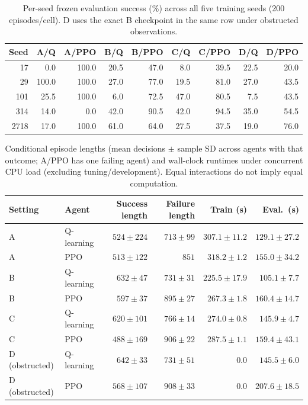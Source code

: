 \begin{table}[H]
\centering\small
\begin{tabular}{@{}rrrrrrrrr@{}}
\toprule
Seed & A/Q & A/PPO & B/Q & B/PPO & C/Q & C/PPO & D/Q & D/PPO \\
\midrule
17   &   0.0 & 100.0 & 20.5 & 47.0 &  8.0 & 39.5 & 22.5 & 20.0 \\
29   & 100.0 & 100.0 & 27.0 & 77.0 & 19.5 & 81.0 & 27.0 & 43.5 \\
101  &  25.5 & 100.0 &  6.0 & 72.5 & 47.0 & 80.5 &  7.5 & 43.5 \\
314  &  14.0 &   0.0 & 42.0 & 90.5 & 42.0 & 94.5 & 35.0 & 54.5 \\
2718 &  17.0 & 100.0 & 61.0 & 64.0 & 27.5 & 37.5 & 19.0 & 76.0 \\
\bottomrule
\end{tabular}
\caption{Per-seed frozen evaluation success (\%) across all five training seeds (200 episodes/cell). D uses the exact B checkpoint in the same row under obstructed observations.}
\label{tab:seeds}
\end{table}

\begin{table}[H]
\centering\small\setlength{\tabcolsep}{4pt}
\begin{tabular}{@{}llrrrr@{}}
\toprule
Setting & Agent & Success length & Failure length & Train (s) & Eval.\ (s) \\
\midrule
A & Q-learning & $524 \pm 224$ & $713 \pm 99$ & $307.1 \pm 11.2$ & $129.1 \pm 27.2$ \\
A & PPO & $513 \pm 122$ & $851$ & $318.2 \pm 1.2$ & $155.0 \pm 34.2$ \\
B & Q-learning & $632 \pm 47$ & $731 \pm 31$ & $225.5 \pm 17.9$ & $105.1 \pm 7.7$ \\
B & PPO & $597 \pm 37$ & $895 \pm 27$ & $267.3 \pm 1.8$ & $160.4 \pm 14.7$ \\
C & Q-learning & $620 \pm 101$ & $766 \pm 14$ & $274.0 \pm 0.8$ & $145.9 \pm 4.7$ \\
C & PPO & $488 \pm 169$ & $906 \pm 22$ & $287.5 \pm 1.1$ & $159.4 \pm 43.1$ \\
D (obstructed) & Q-learning & $642 \pm 33$ & $731 \pm 51$ & $0.0$ & $145.5 \pm 6.0$ \\
D (obstructed) & PPO & $568 \pm 107$ & $908 \pm 33$ & $0.0$ & $207.6 \pm 18.5$ \\
\bottomrule
\end{tabular}
\caption{Conditional episode lengths (mean decisions $\pm$ sample SD across agents with that outcome; A/PPO has one failing agent) and wall-clock runtimes under concurrent CPU load (excluding tuning/development). Equal interactions do not imply equal computation.}
\label{tab:costs}
\end{table}


